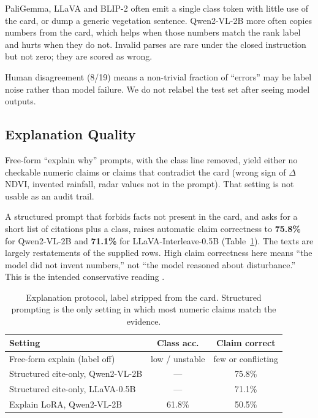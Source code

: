 \documentclass[11pt]{article}
\begin{document}
PaliGemma, LLaVA and BLIP-2 often emit a single class token with
little use of the card, or dump a generic vegetation sentence.
Qwen2-VL-2B more often copies numbers from the card, which helps
when those numbers match the rank label and hurts when they do not.
Invalid parses are rare under the closed instruction but not zero;
they are scored as wrong.

Human disagreement (8/19) means a non-trivial fraction of ``errors''
may be label noise rather than model failure. We do not relabel the
test set after seeing model outputs.

\subsection{Explanation Quality}
\label{sec:expl}

Free-form ``explain why'' prompts, with the class line removed,
yield either no checkable numeric claims or claims that contradict
the card (wrong sign of $\Delta$NDVI, invented rainfall, radar
values not in the prompt). That setting is not usable as an audit
trail.

A structured prompt that forbids facts not present in the card, and
asks for a short list of citations plus a class, raises automatic
claim correctness to \textbf{75.8\%} for Qwen2-VL-2B and
\textbf{71.1\%} for LLaVA-Interleave-0.5B (Table~\ref{tab:explain}).
The texts are largely restatements of the supplied rows. High claim
correctness here means ``the model did not invent numbers,'' not
``the model reasoned about disturbance.'' This is the intended
conservative reading \citep{jacovi2020,turpin2023}.

\begin{table}[t]
\centering
\small
\begin{tabular}{lcc}
\toprule
Setting & Class acc. & Claim correct \\
\midrule
Free-form explain (label off) & low / unstable & few or conflicting \\
Structured cite-only, Qwen2-VL-2B & --- & 75.8\% \\
Structured cite-only, LLaVA-0.5B & --- & 71.1\% \\
Explain LoRA, Qwen2-VL-2B & 61.8\% & 50.5\% \\
\bottomrule
\end{tabular}
\caption{Explanation protocol, label stripped from the card.
Structured prompting is the only setting in which most numeric
claims match the evidence.}
\label{tab:explain}
\end{table}
\end{document}
